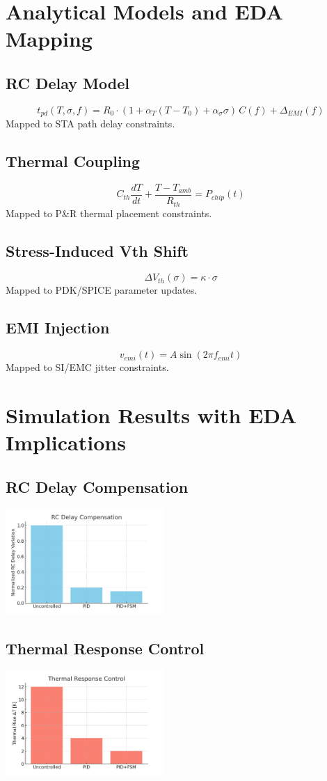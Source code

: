 \documentclass[conference]{IEEEtran}
\begin{document}
\section{Analytical Models and EDA Mapping}
\subsection{RC Delay Model}
\[
t_{pd}(T,\sigma,f) = R_0 \cdot (1+\alpha_T (T-T_0)+\alpha_\sigma \sigma)\,C(f)+\Delta_{EMI}(f)
\]
Mapped to STA path delay constraints.

\subsection{Thermal Coupling}
\[
C_{th}\frac{dT}{dt} + \frac{T-T_{amb}}{R_{th}} = P_{chip}(t)
\]
Mapped to P\&R thermal placement constraints.

\subsection{Stress-Induced Vth Shift}
\[
\Delta V_{th}(\sigma)=\kappa \cdot \sigma
\]
Mapped to PDK/SPICE parameter updates.

\subsection{EMI Injection}
\[
v_{emi}(t)=A\sin(2\pi f_{emi} t)
\]
Mapped to SI/EMC jitter constraints.

\section{Simulation Results with EDA Implications}
\subsection{RC Delay Compensation}
\includegraphics[width=0.45\textwidth]{sim_delay_rc.png}

\subsection{Thermal Response Control}
\includegraphics[width=0.45\textwidth]{sim_thermal_response.png}
\end{document}
